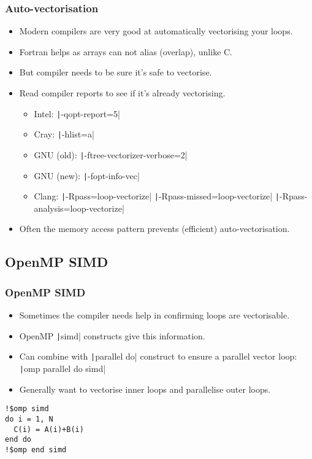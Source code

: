 \documentclass[aspectratio=169]{beamer}
\begin{document}
\begin{frame}
\frametitle{Auto-vectorisation}
\begin{itemize}
  \item Modern compilers are very good at automatically vectorising your loops.
  \item Fortran helps as arrays can not alias (overlap), unlike C.
  \item But compiler needs to be sure it's safe to vectorise.
  \item Read compiler reports to see if it's already vectorising.
    \begin{itemize}
      \item Intel: \texttt|-qopt-report=5|
      \item Cray: \texttt|-hlist=a|
      \item GNU (old): \texttt|-ftree-vectorizer-verbose=2|
      \item GNU (new): \texttt|-fopt-info-vec|
      \item Clang: \texttt|-Rpass=loop-vectorize| \texttt|-Rpass-missed=loop-vectorize| \texttt|-Rpass-analysis=loop-vectorize|
    \end{itemize}
  \item Often the memory access pattern prevents (efficient) auto-vectorisation.
\end{itemize}
\end{frame}

\subsection{OpenMP SIMD}
\begin{frame}[fragile]
\frametitle{OpenMP SIMD}
\begin{itemize}
  \item Sometimes the compiler needs help in confirming loops are vectorisable.
  \item OpenMP \texttt|simd| constructs give this information.
  \item Can combine with \texttt|parallel do| construct to ensure a parallel vector loop: \texttt|omp parallel do simd|
  \item Generally want to vectorise inner loops and parallelise outer loops.
\end{itemize}

\begin{verbatim}
!$omp simd
do i = 1, N
  C(i) = A(i)+B(i)
end do
!$omp end simd
\end{verbatim}
\end{frame}
\end{document}
